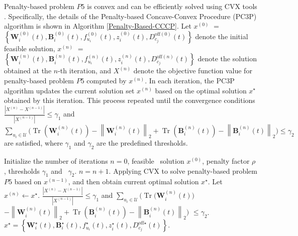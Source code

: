 \documentclass[10pt,journal,compsoc]{IEEEtran}
\renewcommand{\algorithmicrequire}{ \textbf{Input:}}
\renewcommand{\algorithmicensure}{ \textbf{Output:}}
\begin{document}
Penalty-based problem $P5$ is convex and can be efficiently solved using CVX tools \cite{Solution: Convex-Optimization-Book}. 
Specifically, the details of the Penalty-based Concave-Convex Procedure (PC3P) algorithm is shown in Algorithm \ref{Penalty-Based-CCCP}.
Let $x^{(0)}$ $=$ $\left\{\mathbf{W}^{(0)}_{i}(t), \mathbf{B}^{(0)}_{i}(t), f^{(0)}_{u_{i}}(t), z^{(0)}_{i}(t), D_{c_{j}}^{\text{off}(0)}(t)\right\}$ denote the initial feasible solution, 
$x^{(n)}$ $=$ $\left\{\mathbf{W}^{(n)}_{i}(t), \mathbf{B}^{(n)}_{i}(t), f^{(n)}_{u_{i}}(t), z^{(n)}_{i}(t), D_{c_{j}}^{\text{off}(n)}(t)\right\}$ denote the solution obtained at the $n$-th iteration, and $X^{(n)}$ denote the objective function value for penalty-based problem $P5$ computed by $x^{(n)}$.
In each iteration, the PC3P algorithm updates the current solution set $x^{(n)}$ based on the optimal solution $x^{\star}$ obtained by this iteration. 
This process repeated until the convergence conditions $\frac{\left|X^{(n)} - X^{(n - 1)}\right|}{\left|X^{(n - 1)}\right|} \le \gamma_{1}$ and $\sum_{u_{i} \in \mathcal{U}}\Big(\operatorname{Tr}\left(\mathbf{W}^{(n)}_{i}(t)\right)-\left\|\mathbf{W}^{(n)}_{i}(t)\right\|_{2} + \operatorname{Tr}\left(\mathbf{B}^{(n)}_{i}(t)\right)-\left\|\mathbf{B}^{(n)}_{i}(t)\right\|_{2}\Big) \leq \gamma_{2}$ are satisfied,  
where $\gamma_{1}$ and $\gamma_{2}$ are the predefined thresholds.

 \begin{algorithm}[t]
     \caption{The details of PC3P algorithm}
     \label{Penalty-Based-CCCP}
     \renewcommand{\algorithmicrequire}{\textbf{input:}}
     \renewcommand{\algorithmicensure}{\textbf{output:}}
     \begin{algorithmic}[1]
         \REQUIRE Initialize the number of iterations $n = 0$, feasible \STATEx \quad \, solution $x^{(0)}$, penalty factor $\rho$, thresholds $\gamma_{1}$ and \STATEx \quad \, $\gamma_{2}$.
         \REPEAT
             \STATE $n = n + 1$.
             \STATE Applying CVX to solve penalty-based problem  \STATEx \quad  $P5$ based on $x^{(n - 1)}$, and then obtain current \STATEx \quad optimal solution ${x}^{\star}$.
             \STATE Let $x^{(n)} \leftarrow  {x}^{\star}$.
         \UNTIL $\frac{\left|X^{(n)} - X^{(n - 1)}\right|}{\left|X^{(n - 1)}\right|} \le \gamma_{1}$ and $\sum_{u_{i} \in \mathcal{U}}\Big(\operatorname{Tr}\Big(\mathbf{W}^{(n)}_{i}(t)\Big)$ \STATEx \qquad $-\left\|\mathbf{W}^{(n)}_{i}(t)\right\|_{2} + \operatorname{Tr}\left(\mathbf{B}^{(n)}_{i}(t)\right)-\left\|\mathbf{B}^{(n)}_{i}(t)\right\|_{2}\Big)$ \STATEx \qquad $\leq \gamma_{2}$.
         \ENSURE ${x}^{\star} = \left\{{\mathbf{W}}^{\star}_{i}(t), {\mathbf{B}}^{\star}_{i}(t), {f}^{\star}_{u_{i}}(t), {z}^{\star}_{i}(t), {D}_{c_{j}}^{\text{off} \star}(t)\right\}$.
     \end{algorithmic}
 \end{algorithm}
\end{document}
